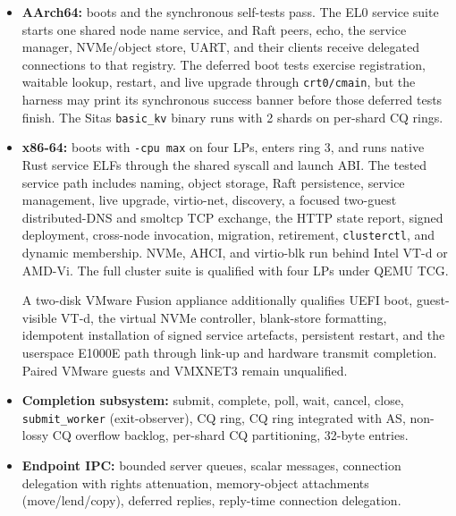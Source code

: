 \begin{itemize}
    \item \textbf{AArch64:} boots and the synchronous self-tests pass. The EL0
        service suite starts one shared node name service, and Raft peers, echo,
        the service manager, NVMe/object store, UART, and their clients receive
        delegated connections to that registry. The deferred boot tests
        exercise registration, waitable lookup, restart, and live upgrade
        through \texttt{crt0/cmain}, but the harness may print its synchronous
        success banner before those deferred tests finish. The Sitas
        \texttt{basic\_kv} binary runs with 2 shards on per-shard CQ rings.

    \item \textbf{x86-64:} boots with \texttt{-cpu max} on four LPs, enters
        ring 3, and runs native Rust service ELFs through the shared syscall and
        launch ABI. The tested service path includes naming, object storage,
        Raft persistence, service management, live upgrade, virtio-net,
        discovery, a focused two-guest distributed-DNS and smoltcp TCP exchange, the HTTP
        state report, signed deployment, cross-node invocation, migration,
        retirement, \texttt{clusterctl}, and dynamic membership. NVMe, AHCI,
        and virtio-blk run behind Intel VT-d or AMD-Vi. The full cluster suite
        is qualified with four LPs under QEMU TCG.

        A two-disk VMware Fusion appliance additionally qualifies UEFI boot,
        guest-visible VT-d, the virtual NVMe controller, blank-store formatting,
        idempotent installation of signed service artefacts, persistent
        restart, and the userspace E1000E path through link-up and hardware
        transmit completion. Paired VMware guests and VMXNET3 remain
        unqualified.

    \item \textbf{Completion subsystem:} submit, complete, poll, wait, cancel,
        close, \texttt{submit\_worker} (exit-observer), CQ ring, CQ ring
        integrated with AS, non-lossy CQ overflow backlog, per-shard CQ
        partitioning, 32-byte entries.

    \item \textbf{Endpoint IPC:} bounded server queues, scalar messages,
        connection delegation with rights attenuation, memory-object attachments
        (move/lend/copy), deferred replies, reply-time connection delegation.


\end{itemize}

